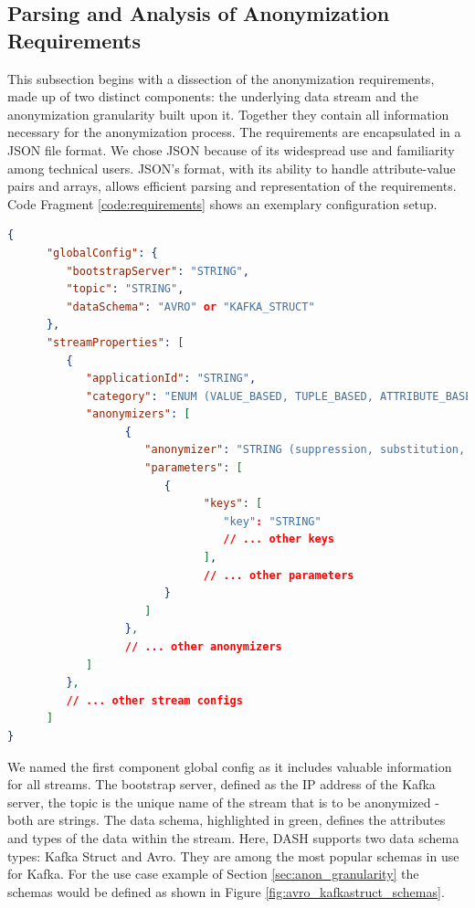 \subsection{Parsing and Analysis of Anonymization Requirements\label{sec:json_loader}}
This subsection begins with a dissection of the anonymization requirements, made up of two distinct components: the underlying data stream and the anony\-miza\-tion granularity built upon it. Together they contain all information necessary for the anonymization process. The requirements are encapsulated in a JSON file format. We chose JSON because of its widespread use and familiarity among technical users. JSON's format, with its ability to handle attribute-value pairs and arrays, allows efficient parsing and representation of the requirements. Code Fragment \ref{code:requirements} shows an exemplary configuration setup. 

\begin{lstlisting}[language=json, captionpos=b, caption={Example JSON Configuration for DASH. The \textit{globalConfig} specifies the underlying data stream. The \textit{Schema} refers to either an \textit{AVRO} or \textit{KAFKA\_STRUCT} data schema. Each entry in the \textit{streamProperties} defines an anonymized version of the original data consisting of a list of \textit{anonymizers}.}, breaklines=true, basicstyle=\ttfamily\footnotesize, frame=tb, label=code:requirements]
{
      "globalConfig": {
         "bootstrapServer": "STRING",
         "topic": "STRING",
         "dataSchema": "AVRO" or "KAFKA_STRUCT"
      },
      "streamProperties": [
         {
            "applicationId": "STRING",
            "category": "ENUM (VALUE_BASED, TUPLE_BASED, ATTRIBUTE_BASED, TABLE_BASED)",
            "anonymizers": [
                  {
                     "anonymizer": "STRING (suppression, substitution, etc.)",
                     "parameters": [
                        {
                              "keys": [
                                 "key": "STRING"
                                 // ... other keys
                              ],
                              // ... other parameters
                        }
                     ]
                  },
                  // ... other anonymizers
            ]
         },
         // ... other stream configs
      ]
}
\end{lstlisting}
   
We named the first component global config as it includes valuable information for all streams. The bootstrap server, defined as the IP address of the Kafka server, the topic is the unique name of the stream that is to be anonymized - both are strings. The data schema, highlighted in green, defines the attributes and types of the data within the stream. Here, \ac{DASH} supports two data schema types: Kafka Struct and Avro. They are among the most popular schemas in use for Kafka. For the use case example of Section \ref{sec:anon_granularity} the schemas would be defined as shown in Figure \ref{fig:avro_kafkastruct_schemas}. 

